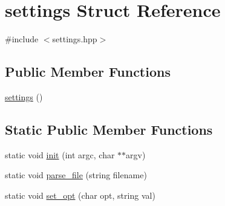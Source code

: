 \hypertarget{structsettings}{\section{settings Struct Reference}
\label{structsettings}
}


{\ttfamily \#include $<$settings.\-hpp$>$}

\subsection*{Public Member Functions}
\begin{DoxyCompactItemize}
\item 
\hyperlink{structsettings_a75dddcdfe65d5b1911a31b7dcd79a6ca}{settings} ()
\end{DoxyCompactItemize}
\subsection*{Static Public Member Functions}
\begin{DoxyCompactItemize}
\item 
static void \hyperlink{structsettings_ac84eac17ece6624b10feb3dc58a14d03}{init} (int argc, char $\ast$$\ast$argv)
\item 
static void \hyperlink{structsettings_acc455fff19091e60dd078e9f20dd09ae}{parse\-\_\-file} (string filename)
\item 
static void \hyperlink{structsettings_a5622600a31d64d59d566b26aa4b2828e}{set\-\_\-opt} (char opt, string val)
\end{DoxyCompactItemize}
